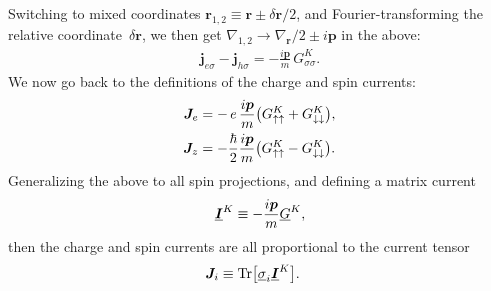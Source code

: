 Switching to mixed coordinates $\bm{r}_{1,2} \equiv \bm{r} \pm \delta\bm{r}/2$, and Fourier-transforming the relative coordinate~$\delta\bm{r}$, we then get $\nabla_{1,2} \rightarrow \nabla_{\bm{r}}/2 \pm i\bm{p}$ in the above:
\begin{align}
  \bm{j}_{e\sigma} - \bm{j}_{h\sigma} =
  -\frac{i\bm{p}}{m} \, G^K_{\sigma\sigma}.
\end{align}
We now go back to the definitions of the charge and spin currents:
\begin{align}
  \bm{J}_{e} &= -\,e\, \frac{i\bm{p}}{m} \big( G^K_{\uparrow\uparrow} + G^K_{\downarrow\downarrow} \big), \\
  \bm{J}_{z} &= -\frac{\hbar}{2} \frac{i\bm{p}}{m} \big( G^K_{\uparrow\uparrow}  - G^K_{\downarrow\downarrow} \big).
\end{align}
Generalizing the above to all spin projections, and defining a matrix current
\begin{equation}
  \underline{\bm{I}}^K \equiv -\frac{i\bm{p}}{m}\underline{G}^K,
\end{equation}
then the charge and spin currents are all proportional to the current tensor
\begin{align}
  \bm{J}_{i} &\equiv \operatorname{Tr}\!\big[\underline{\sigma}_i \underline{\bm{I}}^K \big].
\end{align}



